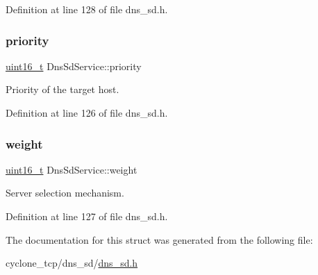 Definition at line 128 of file dns\+\_\+sd.\+h.

\mbox{\label{structDnsSdService_afe6d19247c710cfd1eaa9f427488e498}} 
\subsubsection{\texorpdfstring{priority}{priority}}
{\footnotesize\ttfamily \hyperlink{stdint_8h_a273cf69d639a59973b6019625df33e30}{uint16\+\_\+t} Dns\+Sd\+Service\+::priority}



Priority of the target host. 



Definition at line 126 of file dns\+\_\+sd.\+h.

\mbox{\label{structDnsSdService_a5a9548cecc8e63b7029f48fe83059234}} 
\subsubsection{\texorpdfstring{weight}{weight}}
{\footnotesize\ttfamily \hyperlink{stdint_8h_a273cf69d639a59973b6019625df33e30}{uint16\+\_\+t} Dns\+Sd\+Service\+::weight}



Server selection mechanism. 



Definition at line 127 of file dns\+\_\+sd.\+h.



The documentation for this struct was generated from the following file\+:\begin{DoxyCompactItemize}
\item 
cyclone\+\_\+tcp/dns\+\_\+sd/\hyperlink{dns__sd_8h}{dns\+\_\+sd.\+h}\end{DoxyCompactItemize}
